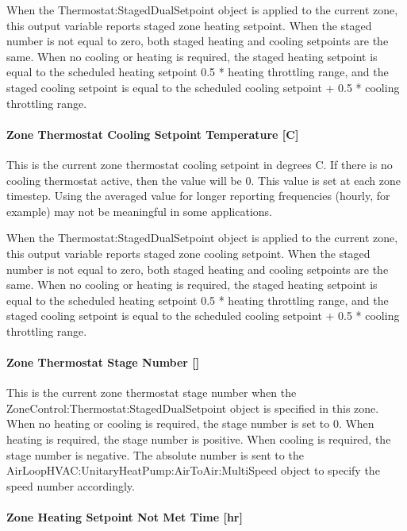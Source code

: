 When the Thermostat:StagedDualSetpoint object is applied to the current zone, this output variable reports staged zone heating setpoint. When the staged number is not equal to zero, both staged heating and cooling setpoints are the same. When no cooling or heating is required, the staged heating setpoint is equal to the scheduled heating setpoint 0.5 * heating throttling range, and the staged cooling setpoint is equal to the scheduled cooling setpoint + 0.5 * cooling throttling range.

\paragraph{Zone Thermostat Cooling Setpoint Temperature {[}C{]}}\label{zone-thermostat-cooling-setpoint-temperature-c}

This is the current zone thermostat cooling setpoint in degrees C. If there is no cooling thermostat active, then the value will be 0. This value is set at each zone timestep. Using the averaged value for longer reporting frequencies (hourly, for example) may not be meaningful in some applications.

When the Thermostat:StagedDualSetpoint object is applied to the current zone, this output variable reports staged zone cooling setpoint. When the staged number is not equal to zero, both staged heating and cooling setpoints are the same. When no cooling or heating is required, the staged heating setpoint is equal to the scheduled heating setpoint 0.5 * heating throttling range, and the staged cooling setpoint is equal to the scheduled cooling setpoint + 0.5 * cooling throttling range.

\paragraph{\texorpdfstring{Zone Thermostat Stage Number {[]}}{Zone Thermostat Stage Number }}\label{zone-thermostat-stage-number}

This is the current zone thermostat stage number when the ZoneControl:Thermostat:StagedDualSetpoint object is specified in this zone. When no heating or cooling is required, the stage number is set to 0. When heating is required, the stage number is positive. When cooling is required, the stage number is negative. The absolute number is sent to the AirLoopHVAC:UnitaryHeatPump:AirToAir:MultiSpeed object to specify the speed number accordingly.

\paragraph{Zone Heating Setpoint Not Met Time {[}hr{]}}\label{zone-heating-setpoint-not-met-time-hr}

